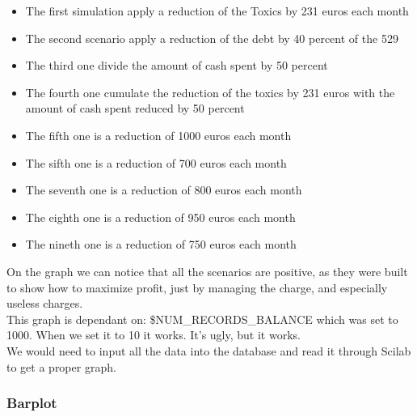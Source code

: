 \documentclass[8pt]{article} %
\begin{document}
\begin{itemize}
	\item{The first simulation apply a reduction of the Toxics by 231 euros each month}
	\item{The second scenario apply a reduction of the debt by 40 percent of the 529}
	\item{The third one divide the amount of cash spent by 50 percent}
	\item{The fourth one cumulate the reduction of the toxics by 231 euros with the amount of cash spent reduced by 50 percent}
	\item{The fifth one is a reduction of 1000 euros each month}
	\item{The sifth one is a reduction of 700 euros each month}
	\item{The seventh one is a reduction of 800 euros each month}
	\item{The eighth one is a reduction of 950 euros each month}
	\item{The nineth one is a reduction of 750 euros each month}
\end{itemize}

On the graph we can notice that all the scenarios are positive, as they were built to show how to maximize profit, just by managing the charge, and especially useless charges.\\



This graph is dependant on: \$NUM\_RECORDS\_BALANCE which was set to 1000. When we set it to 10 it works. It's ugly, but it works.\\

We would need to input all the data into the database and read it through Scilab to get a proper graph.
%

%

\subsubsection{Barplot}
\end{document}
